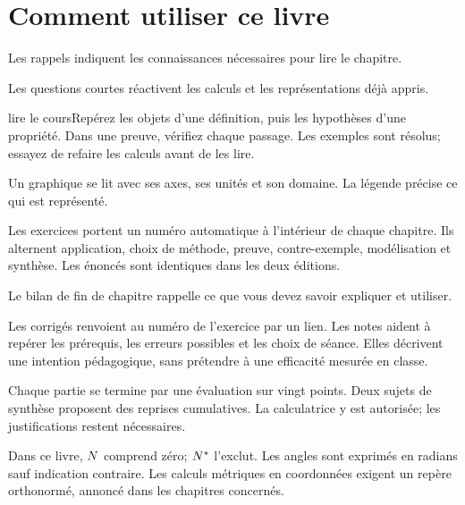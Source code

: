 \chapter*{Comment utiliser ce livre}
\begin{revision}Les rappels indiquent les connaissances nécessaires pour lire le chapitre.\end{revision}
\begin{automatismes}Les questions courtes réactivent les calculs et les représentations déjà appris.\end{automatismes}
\begin{methode}{lire le cours}Repérez les objets d’une définition, puis les hypothèses d’une propriété. Dans une preuve, vérifiez chaque passage. Les exemples sont résolus; essayez de refaire les calculs avant de les lire.\end{methode}
\begin{visualisation}Un graphique se lit avec ses axes, ses unités et son domaine. La légende précise ce qui est représenté.\end{visualisation}
\begin{entrainement}Les exercices portent un numéro automatique à l’intérieur de chaque chapitre. Ils alternent application, choix de méthode, preuve, contre-exemple, modélisation et synthèse. Les énoncés sont identiques dans les deux éditions.\end{entrainement}
\begin{jemeteste}Le bilan de fin de chapitre rappelle ce que vous devez savoir expliquer et utiliser.\end{jemeteste}
\begin{notepourlaclasse}Les corrigés renvoient au numéro de l’exercice par un lien. Les notes aident à repérer les prérequis, les erreurs possibles et les choix de séance. Elles décrivent une intention pédagogique, sans prétendre à une efficacité mesurée en classe.\end{notepourlaclasse}
Chaque partie se termine par une évaluation sur vingt points. Deux sujets de synthèse proposent des reprises cumulatives. La calculatrice y est autorisée; les justifications restent nécessaires.

Dans ce livre, $N$ comprend zéro; $N^*$ l’exclut. Les angles sont exprimés en radians sauf indication contraire. Les calculs métriques en coordonnées exigent un repère orthonormé, annoncé dans les chapitres concernés.
